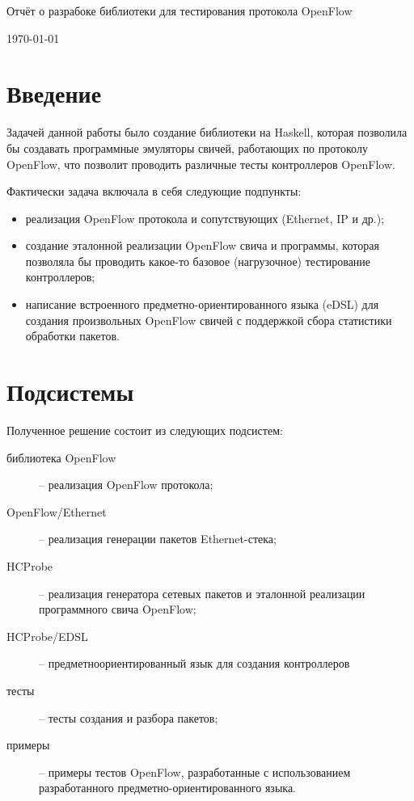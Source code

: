 \documentclass[9pt,a4paper]{article}
\begin{document}
\begin{titlepage}
\begin{center}
\vspace*{\fill}
{\huge Отчёт о разрабоке библиотеки для тестирования протокола OpenFlow}
\par
\vspace*{\fill}
\today
\end{center}
\end{titlepage}

\tableofcontents

\clearpage

\section{Введение}

Задачей данной работы было создание библиотеки на Haskell, которая позволила бы
создавать программные эмуляторы свичей, работающих по протоколу OpenFlow,
что позволит проводить различные тесты контроллеров OpenFlow.

Фактически задача включала в себя следующие подпункты:
\begin{itemize}
  \item реализация OpenFlow протокола и сопутствующих (Ethernet, IP и др.);
  \item создание эталонной реализации OpenFlow свича и программы, которая позволяла бы
    проводить какое-то базовое (нагрузочное) тестирование контроллеров;
  \item написание встроенного предметно-ориентированного языка (eDSL) для создания
    произвольных OpenFlow свичей с поддержкой сбора статистики обработки пакетов.
\end{itemize}

\section{Подсистемы}

Полученное решение состоит из следующих подсистем:

\begin{description}
    \item[библиотека OpenFlow] -- реализация OpenFlow протокола;
    \item[OpenFlow/Ethernet]   -- реализация генерации пакетов Ethernet-стека;
    \item[HCProbe]             -- реализация генератора сетевых пакетов и эталонной
      реализации программного свича OpenFlow;
    \item[HCProbe/EDSL]        -- предметноориентированный язык для создания контроллеров
    \item[тесты]               -- тесты создания и разбора пакетов;
    \item[примеры]             -- примеры тестов OpenFlow, разработанные с использованием
      разработанного предметно-ориентированного языка.
\end{description}
\end{document}
